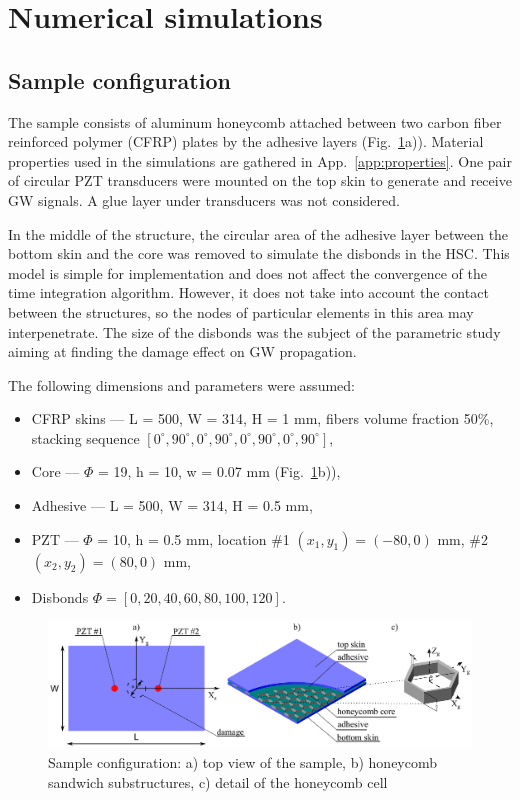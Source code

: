 \documentclass[materials,article,submit,moreauthors,pdftex]{Definitions/mdpi}
\begin{document}
\section{Numerical simulations}
\label{sec:numerical}
\subsection{Sample configuration}
\label{sec:sample}
The sample consists of aluminum honeycomb attached between two carbon fiber reinforced polymer (CFRP) plates by the adhesive layers (Fig.~\ref{fig:honeycomb}a)).
Material properties used in the simulations are gathered in App.~\ref{app:properties}.
One pair of circular PZT transducers were mounted on the top skin to generate and receive GW signals.
A glue layer under transducers was not considered.

In the middle of the structure, the circular area of the adhesive layer between the bottom skin and the core was removed to simulate the disbonds in the HSC.
This model is simple for implementation and does not affect the convergence of the time integration algorithm.
However, it does not take into account the contact between the structures, so the nodes of particular elements in this area may interpenetrate.
The size of the disbonds was the subject of the parametric study aiming at finding the damage effect on GW propagation.

The following dimensions and parameters were assumed:
\begin{itemize}
	\item CFRP skins --- L = 500, W = 314, H = 1 mm, fibers volume fraction 
	50\%, stacking sequence 
	\([0^\circ,90^\circ,0^\circ,90^\circ,0^\circ,90^\circ,0^\circ,90^\circ]\),
	\item Core --- \(\Phi\) = 19, h = 10, w = 0.07 mm 
	(Fig.~\ref{fig:honeycomb}b)),
	\item Adhesive --- L = 500, W = 314, H = 0.5 mm,
	\item PZT --- \(\Phi\) = 10, h = 0.5 mm, location \#1 \((x_1,y_1)=(-80,0)\) 
	mm,	\#2 \((x_2,y_2)=(80,0)\) mm,
	\item Disbonds \(\Phi = \left [0, 20, 40, 60, 80, 100, 120 \right ]\).
\end{itemize}

\begin{figure}
	\begin{center}
		\includegraphics[width=1\linewidth]{../../figures/eps/honeycomb.eps}
	\end{center}
	\caption{Sample configuration: a) top view of the sample, b) honeycomb sandwich substructures, c) detail of the honeycomb cell}
	\label{fig:honeycomb}
\end{figure}
\end{document}
